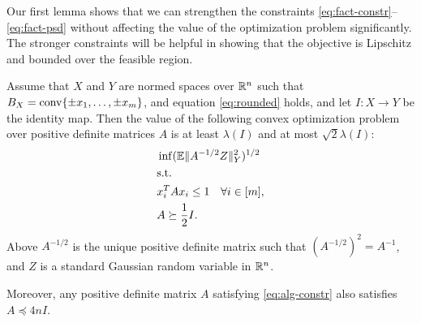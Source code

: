 Our first lemma shows that we can strengthen the constraints
\eqref{eq:fact-constr}--\eqref{eq:fact-psd} without affecting the
value of the optimization problem significantly. The stronger
constraints will be helpful in showing that the objective is Lipschitz
and bounded over the feasible region. 

\begin{lemma}\label{lm:psd-lb}
  Assume that $X$ and $Y$ are normed spaces over ${\mathbb{R}}^n$ such that $B_X
  = \operatorname{conv}\{\pm x_1, \ldots, \pm x_m\}$, and equation
  \eqref{eq:rounded} holds, and let $I:X \to Y$ be the identity
  map. Then the value of the following convex optimization problem
  over positive definite matrices $A$ is at least $\lambda(I)$ and at
  most $\sqrt{2} \lambda(I)$:
  \begin{align}
    &\inf  (\mathbb{E}\|A^{-1/2} Z\|^2_Y)^{1/2}  \label{eq:alg-obj}\\
    &\text{s.t.}\notag\\
    &x_i^T A x_i \le 1 \ \ \ \forall i \in [m],\label{eq:alg-constr}\\
    &A \succeq \frac12 I.\label{eq:alg-psd}
  \end{align}
  Above $A^{-1/2}$ is the unique positive definite matrix such that
  $(A^{-1/2})^2 = A^{-1}$, and $Z$ is a standard Gaussian random
  variable in ${\mathbb{R}}^n$.

  Moreover, any positive definite matrix $A$ satisfying
  \eqref{eq:alg-constr} also satisfies $A \preceq 4n I$. 
\end{lemma}
